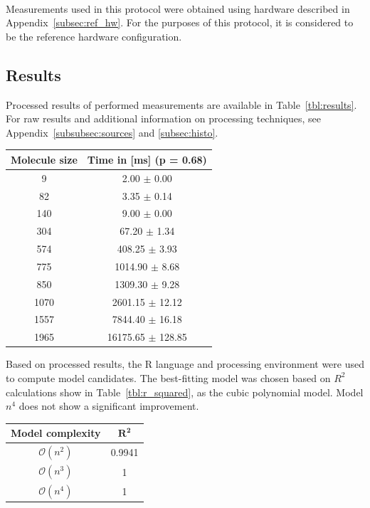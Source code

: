 \documentclass[a4paper,12pt]{article}
\begin{document}
\hfill \\
Measurements used in this protocol were obtained using hardware described in Appendix~\ref{subsec:ref_hw}.
For the purposes of this protocol, it is considered to be the reference hardware configuration.

\subsection{Results}

Processed results of performed measurements are available in Table~\ref{tbl:results}.
For raw results and additional information on processing techniques, see Appendix~\ref{subsubsec:sources}
and \ref{subsec:histo}.

\begin{center}
  \begin{tabular}{ | c | c | }
    \hline
    \textbf{Molecule size} & \textbf{Time in [ms] (p = 0.68)} \\ \hline
    \hline
        9 & 2.00 $\pm$ 0.00 \\ \hline
        82 & 3.35 $\pm$ 0.14 \\ \hline
        140 & 9.00 $\pm$ 0.00 \\ \hline
        304 & 67.20 $\pm$ 1.34 \\ \hline
        574 & 408.25 $\pm$ 3.93 \\ \hline
        775 & 1014.90 $\pm$ 8.68 \\ \hline
        850 & 1309.30 $\pm$ 9.28 \\ \hline
        1070 & 2601.15 $\pm$ 12.12 \\ \hline
        1557 & 7844.40 $\pm$ 16.18 \\ \hline
        1965 & 16175.65 $\pm$ 128.85 \\ \hline
  \end{tabular}
  \label{tbl:results}
\end{center}

Based on processed results, the R language and processing environment were used to compute
model candidates. The best-fitting model was chosen based on $R^2$ calculations show in
Table~\ref{tbl:r_squared}, as the cubic polynomial model. Model $n^4$ does not show
a significant improvement.

\begin{center}
  \begin{tabular}{ | c | c | }
    \hline
    \textbf{Model complexity} & $\bm{R^2}$ \\ \hline
    \hline
        $\mathcal{O}(n^2)$ & 0.9941 \\ \hline
        $\mathcal{O}(n^3)$ & 1 \\ \hline
        $\mathcal{O}(n^4)$ & 1 \\ \hline
  \end{tabular}
  \label{tbl:r_squared}
\end{center}
\end{document}
